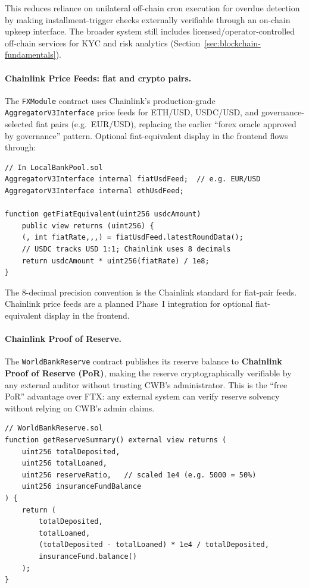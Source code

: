 \documentclass[12pt,a4paper]{report}
\begin{document}
This reduces reliance on unilateral off-chain cron execution for overdue detection by making installment-trigger checks externally verifiable through an on-chain upkeep interface. The broader system still includes licensed/operator-controlled off-chain services for KYC and risk analytics (Section~\ref{sec:blockchain-fundamentals}).

\paragraph{Chainlink Price Feeds: fiat and crypto pairs.}
The \texttt{FXModule} contract uses Chainlink's production-grade \texttt{AggregatorV3Interface} price feeds for ETH/USD, USDC/USD, and governance-selected fiat pairs (e.g.\ EUR/USD), replacing the earlier ``forex oracle approved by governance'' pattern. Optional fiat-equivalent display in the frontend flows through:

\begin{verbatim}
// In LocalBankPool.sol
AggregatorV3Interface internal fiatUsdFeed;  // e.g. EUR/USD
AggregatorV3Interface internal ethUsdFeed;

function getFiatEquivalent(uint256 usdcAmount)
    public view returns (uint256) {
    (, int fiatRate,,,) = fiatUsdFeed.latestRoundData();
    // USDC tracks USD 1:1; Chainlink uses 8 decimals
    return usdcAmount * uint256(fiatRate) / 1e8;
}
\end{verbatim}

The 8-decimal precision convention is the Chainlink standard for fiat-pair feeds. Chainlink price feeds are a planned Phase~I integration for optional fiat-equivalent display in the frontend.

\paragraph{Chainlink Proof of Reserve.}
The \texttt{WorldBankReserve} contract publishes its reserve balance to \textbf{Chainlink Proof of Reserve (PoR)}, making the reserve cryptographically verifiable by any external auditor without trusting CWB's administrator. This is the ``free PoR'' advantage over FTX: any external system can verify reserve solvency without relying on CWB's admin claims.

\begin{verbatim}
// WorldBankReserve.sol
function getReserveSummary() external view returns (
    uint256 totalDeposited,
    uint256 totalLoaned,
    uint256 reserveRatio,   // scaled 1e4 (e.g. 5000 = 50%)
    uint256 insuranceFundBalance
) {
    return (
        totalDeposited,
        totalLoaned,
        (totalDeposited - totalLoaned) * 1e4 / totalDeposited,
        insuranceFund.balance()
    );
}
\end{verbatim}
\end{document}
